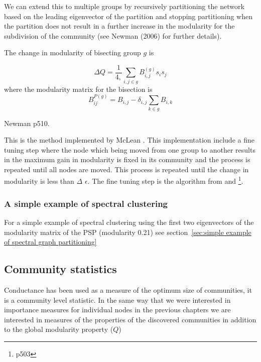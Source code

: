 We can extend this to multiple groups by recursively partitioning the network based on the leading eigenvector of the partition and stopping partitioning when the partition does not result in a further increase in the modularity for the subdivision of the community (see Newman (2006) for further details).

The change in modularity of bisecting group $g$ is 

\begin{equation}
    \Delta Q = \frac{1}{4,} \sum_{i,j \in g} B_{i,j}^{(g)}s_i s_j
\end{equation}
where the modularity matrix for the bisection is 
\begin{equation}
B_{ij}^{P(g)} = B_{i,j} - \delta_{i,j}\sum_{k \in g} B_{i,k}  
\end{equation}
\label{eq:Change in modularity spectral clustering}

Newman \cite{newman2018networks} p510.

This is the method implemented by McLean \cite{mclean2016improved}. This implementation include a fine tuning step where the node which being moved from one group to another results in the maximum gain in modularity is fixed in its community and the process is repeated until all nodes are moved. This process is repeated until the change in modularity is less than $\Delta$ $\epsilon$\cite{mclean2016improved}. The fine tuning step is the algorithm from \cite{newman2006modularity} and \cite{newman2018networks}\footnote{p503}.



\subsubsection{A simple example of spectral clustering}

For a simple example of spectral clustering using the first two eigenvectors of the modularity matrix of the PSP (modularity 0.21) see section~\ref{sec:simple example of spectral graph partitioning}

\subsection{Community statistics}
\label{sec:Fortunato community statistics}

Conductance has been used as a measure of the optimum size of communities\cite{leskovec2010empirical}, it is a community level statistic. In the same way that we were interested in importance measures for individual nodes in the previous chapters we are interested in measures of the properties of the discovered communities in addition to the global modularity property ($Q$)

